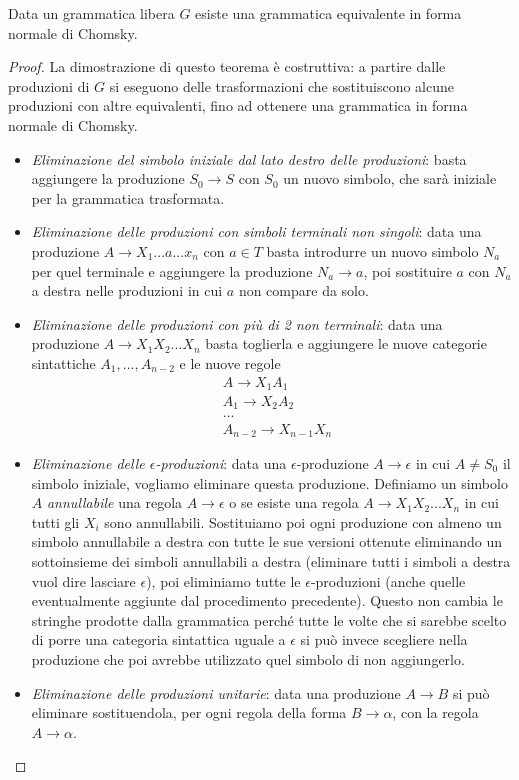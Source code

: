 \documentclass[12pt]{article}
\numberwithin{theorem}{subsection}
\begin{document}
\begin{theorem}
	Data un grammatica libera $G$ esiste una grammatica equivalente in forma normale di Chomsky.
\end{theorem}
\begin{proof}
	La dimostrazione di questo teorema è costruttiva: a partire dalle produzioni di $G$ si eseguono delle trasformazioni che sostituiscono alcune produzioni con altre equivalenti, fino ad ottenere una grammatica in forma normale di Chomsky.
	
	\begin{itemize}
		\item \textit{Eliminazione del simbolo iniziale dal lato destro delle produzioni}: basta aggiungere la produzione $S_0 \rightarrow S$ con $S_0$ un nuovo simbolo, che sarà iniziale per la grammatica trasformata.
		\item \textit{Eliminazione delle produzioni con simboli terminali non singoli}: data una produzione $A \rightarrow X_1 ... a ... x_n$ con $a \in T$ basta introdurre un nuovo simbolo $N_a$ per quel terminale e aggiungere la produzione $N_a \rightarrow a$, poi sostituire $a$ con $N_a$ a destra nelle produzioni in cui $a$ non compare da solo.
		\item \textit{Eliminazione delle produzioni con più di 2 non terminali}: data una produzione $A \rightarrow X_1 X_2 ... X_n$ basta toglierla e aggiungere le nuove categorie sintattiche $A_1, ..., A_{n-2}$ e le nuove regole
		\begin{align*}
		&A \rightarrow X_1 A_1 \\
		&A_1 \rightarrow X_2 A_2 \\
		&... \\
		&A_{n-2} \rightarrow X_{n-1} X_n
		\end{align*}
		\item \textit{Eliminazione delle $\epsilon$-produzioni}: data una $\epsilon$-produzione $A \rightarrow \epsilon$ in cui $A \neq S_0$ il simbolo iniziale, vogliamo eliminare questa produzione. Definiamo un simbolo $A$ \textit{annullabile} una regola $A \rightarrow \epsilon$ o se esiste una regola $A \rightarrow X_1 X_2 ... X_n$ in cui tutti gli $X_i$ sono annullabili. Sostituiamo poi ogni produzione con almeno un simbolo annullabile a destra con tutte le sue versioni ottenute eliminando un sottoinsieme dei simboli annullabili a destra (eliminare tutti i simboli a destra vuol dire lasciare $\epsilon$), poi eliminiamo tutte le $\epsilon$-produzioni (anche quelle eventualmente aggiunte dal procedimento precedente). Questo non cambia le stringhe prodotte dalla grammatica perché tutte le volte che si sarebbe scelto di porre una categoria sintattica uguale a $\epsilon$ si può invece scegliere nella produzione che poi avrebbe utilizzato quel simbolo di non aggiungerlo.
		\item \textit{Eliminazione delle produzioni unitarie}: data una produzione $A \rightarrow B$ si può eliminare sostituendola, per ogni regola della forma $B \rightarrow \alpha$, con la regola $A \rightarrow \alpha$.
	\end{itemize}
\end{proof}
\end{document}
